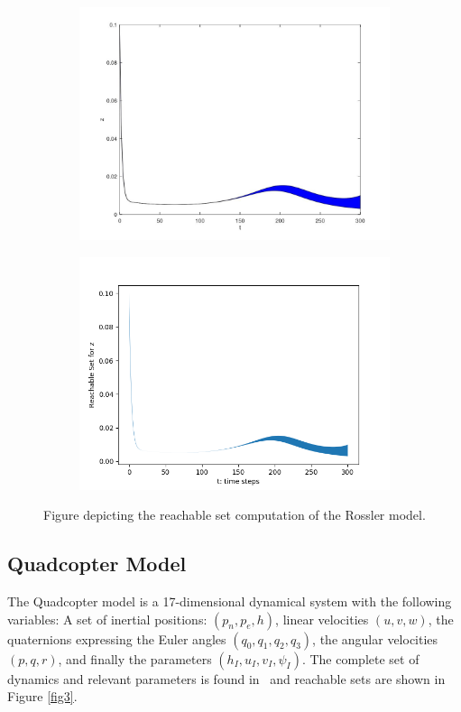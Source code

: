 \documentclass[EPiC]{easychair}
\begin{document}
\begin{figure}[h]
    \begin{subfigure}{0.5\textwidth}
    \centering
    \includegraphics[width=\textwidth]{SapoFigures/Rosslert/SapoRosslerZ.jpg}
    \end{subfigure}
    \begin{subfigure}{0.6\textwidth}
    \centering
    \includegraphics[width=\textwidth]{SapoFigures/Rosslert/KaaRosslerZ.png}
    \end{subfigure}
    
    \caption{Figure depicting the reachable set computation of the Rossler model.} 
    \label{fig2}
\end{figure}

\subsection{Quadcopter Model}
\noindent The Quadcopter model is a 17-dimensional dynamical system with the following variables:
A set of inertial positions: $(p_n,p_e,h)$, linear velocities $(u,v,w)$, the quaternions expressing the Euler angles $(q_0,q_1,q_2,q_3)$, the angular velocities $(p,q,r)$, and finally the parameters $(h_I, u_I, v_I, \psi_I)$. The complete set of dynamics and relevant parameters is found in~\cite{dreossi2017reachability} and reachable sets are shown in Figure \ref{fig3}.
\end{document}
